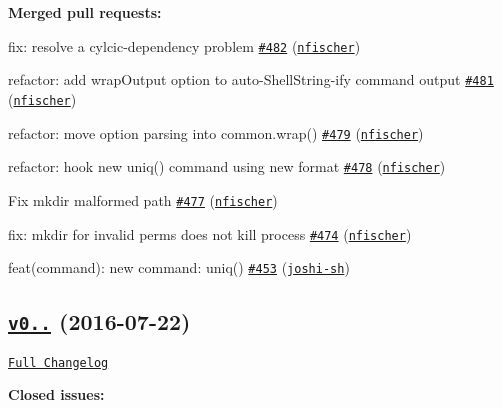 {\bfseries Merged pull requests\+:}


\begin{DoxyItemize}
\item fix\+: resolve a cylcic-\/dependency problem \href{https://github.com/shelljs/shelljs/pull/482}{\tt \#482} (\href{https://github.com/nfischer}{\tt nfischer})
\item refactor\+: add wrap\+Output option to auto-\/\+Shell\+String-\/ify command output \href{https://github.com/shelljs/shelljs/pull/481}{\tt \#481} (\href{https://github.com/nfischer}{\tt nfischer})
\item refactor\+: move option parsing into common.\+wrap() \href{https://github.com/shelljs/shelljs/pull/479}{\tt \#479} (\href{https://github.com/nfischer}{\tt nfischer})
\item refactor\+: hook new uniq() command using new format \href{https://github.com/shelljs/shelljs/pull/478}{\tt \#478} (\href{https://github.com/nfischer}{\tt nfischer})
\item Fix mkdir malformed path \href{https://github.com/shelljs/shelljs/pull/477}{\tt \#477} (\href{https://github.com/nfischer}{\tt nfischer})
\item fix\+: mkdir for invalid perms does not kill process \href{https://github.com/shelljs/shelljs/pull/474}{\tt \#474} (\href{https://github.com/nfischer}{\tt nfischer})
\item feat(command)\+: new command\+: uniq() \href{https://github.com/shelljs/shelljs/pull/453}{\tt \#453} (\href{https://github.com/joshi-sh}{\tt joshi-\/sh})
\end{DoxyItemize}

\subsection*{\href{https://github.com/shelljs/shelljs/tree/v0.7.1}{\tt v0..} (2016-\/07-\/22)}

\href{https://github.com/shelljs/shelljs/compare/v0.7.0...v0.7.1}{\tt Full Changelog}

{\bfseries Closed issues\+:}


